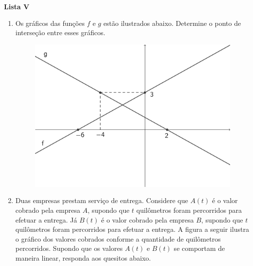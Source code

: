 \documentclass[12pt,a4paper]{article}
\begin{document}
\begin{center}
  \textbf{Lista V}
\end{center}

\begin{enumerate}
  \item Os gráficos das funções $f$ e $g$ estão ilustrados abaixo. Determine o ponto de interseção entre esses gráficos.
  
    \begin{figure}[H]
     \centering
     \includegraphics[scale=0.6]{figura/grafico-lista-v-20.2.png}
    \end{figure}
  
  \item Duas empresas prestam serviço de entrega. Considere que $A(t)$ é o valor
    cobrado pela empresa $A$, supondo que $t$ quilômetros foram percorridos para
    efetuar a entrega. Já $B(t)$ é o valor cobrado pela empresa $B$, supondo que
    $t$ quilômetros foram percorridos para efetuar a entrega. A figura a seguir
    ilustra o gráfico dos valores cobrados conforme a quantidade de quilômetros
    percorridos. Supondo que os valores $A(t)$ e $B(t)$ se comportam de maneira
    linear, responda aos quesitos abaixo.
  

\end{enumerate}
\end{document}
